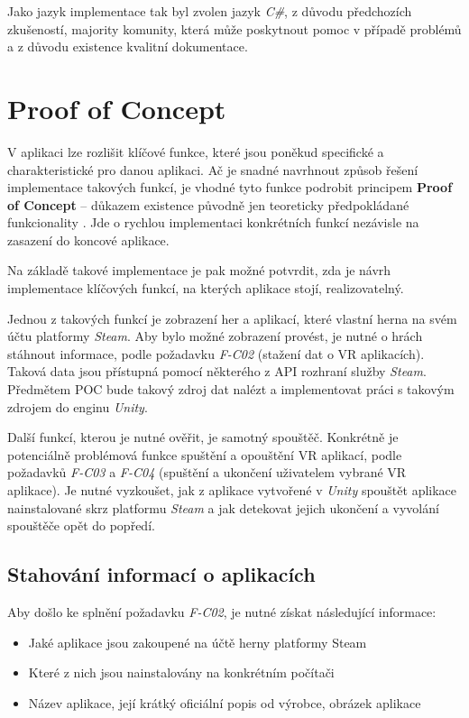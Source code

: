 Jako jazyk implementace tak byl zvolen jazyk \emph{C\#}, z důvodu
předchozích zkušeností, majority komunity, která může poskytnout pomoc v
případě problémů a z důvodu existence kvalitní dokumentace.

\section{Proof of Concept}\label{proof-of-concept}

V aplikaci lze rozlišit klíčové funkce, které jsou poněkud specifické a
charakteristické pro danou aplikaci. Ač je snadné navrhnout způsob
řešení implementace takových funkcí, je vhodné tyto funkce podrobit
principem \textbf{Proof of Concept} -- důkazem existence původně jen
teoreticky předpokládané funkcionality \autocite{proofofconcept}. Jde o rychlou implementaci
konkrétních funkcí nezávisle na zasazení do koncové aplikace.

Na základě takové implementace je pak možné potvrdit, zda je návrh
implementace klíčových funkcí, na kterých aplikace stojí,
realizovatelný.

Jednou z takových funkcí je zobrazení her a aplikací, které vlastní herna na svém
účtu platformy \emph{Steam}. Aby bylo možné zobrazení provést, je nutné
o hrách stáhnout informace, podle požadavku \emph{F-C02} (stažení dat o
VR aplikacích). Taková data jsou přístupná pomocí některého z API
rozhraní služby \emph{Steam}. Předmětem POC bude takový zdroj dat nalézt
a implementovat práci s takovým zdrojem do enginu \emph{Unity}.

Další funkcí, kterou je nutné ověřit, je samotný spouštěč. Konkrétně
je potenciálně problémová funkce spuštění a opouštění VR aplikací, podle
požadavků \emph{F-C03} a \emph{F-C04} (spuštění a ukončení uživatelem
vybrané VR aplikace). Je nutné vyzkoušet, jak z aplikace vytvořené v
\emph{Unity} spouštět aplikace nainstalované skrz platformu \emph{Steam}
a jak detekovat jejich ukončení a vyvolání spouštěče opět do popředí.

\subsection{Stahování informací o
aplikacích}\label{stahovuxe1nuxed-informacuxed-o-aplikacuxedch}

Aby došlo ke splnění požadavku \emph{F-C02}, je nutné získat následující
informace:

\begin{itemize}
\tightlist
\item
  Jaké aplikace jsou zakoupené na účtě herny platformy Steam
\item
  Které z nich jsou nainstalovány na konkrétním počítači
\item
  Název aplikace, její krátký oficiální popis od výrobce, obrázek
  aplikace
\end{itemize}

